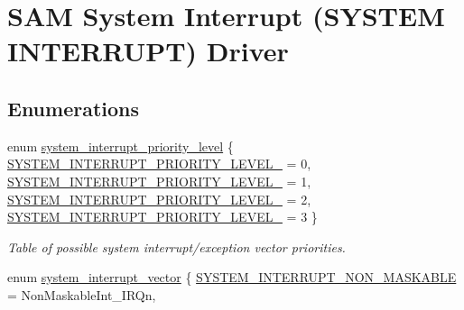 \hypertarget{group__asfdoc__sam0__system__interrupt__group}{}\section{S\+AM System Interrupt (S\+Y\+S\+T\+EM I\+N\+T\+E\+R\+R\+U\+PT) Driver}
\label{group__asfdoc__sam0__system__interrupt__group}
\subsection*{Enumerations}
\begin{DoxyCompactItemize}
\item 
enum \mbox{\hyperlink{group__asfdoc__sam0__system__interrupt__group_ga6d21907577ff204de7f5fa4642c84589}{system\+\_\+interrupt\+\_\+priority\+\_\+level}} \{ \mbox{\hyperlink{group__asfdoc__sam0__system__interrupt__group_gga6d21907577ff204de7f5fa4642c84589a0f1cdf1b338d57e8ca09e7007f72086f}{S\+Y\+S\+T\+E\+M\+\_\+\+I\+N\+T\+E\+R\+R\+U\+P\+T\+\_\+\+P\+R\+I\+O\+R\+I\+T\+Y\+\_\+\+L\+E\+V\+E\+L\+\_}} = 0, 
\mbox{\hyperlink{group__asfdoc__sam0__system__interrupt__group_gga6d21907577ff204de7f5fa4642c84589af0f65bd2a3ef76e3e3dabcfc00a012e4}{S\+Y\+S\+T\+E\+M\+\_\+\+I\+N\+T\+E\+R\+R\+U\+P\+T\+\_\+\+P\+R\+I\+O\+R\+I\+T\+Y\+\_\+\+L\+E\+V\+E\+L\+\_}} = 1, 
\mbox{\hyperlink{group__asfdoc__sam0__system__interrupt__group_gga6d21907577ff204de7f5fa4642c84589a1223c3ab580e129c952773a0726d33ea}{S\+Y\+S\+T\+E\+M\+\_\+\+I\+N\+T\+E\+R\+R\+U\+P\+T\+\_\+\+P\+R\+I\+O\+R\+I\+T\+Y\+\_\+\+L\+E\+V\+E\+L\+\_}} = 2, 
\mbox{\hyperlink{group__asfdoc__sam0__system__interrupt__group_gga6d21907577ff204de7f5fa4642c84589a97e6f898ad4d881e5c693ce14c242761}{S\+Y\+S\+T\+E\+M\+\_\+\+I\+N\+T\+E\+R\+R\+U\+P\+T\+\_\+\+P\+R\+I\+O\+R\+I\+T\+Y\+\_\+\+L\+E\+V\+E\+L\+\_}} = 3
 \}
\begin{DoxyCompactList}\small\item\em Table of possible system interrupt/exception vector priorities. \end{DoxyCompactList}\item 
enum \mbox{\hyperlink{group__asfdoc__sam0__system__interrupt__group_ga43378e6222cc05290c1a0c6a9ba125cf}{system\+\_\+interrupt\+\_\+vector}} \{ \newline
\mbox{\hyperlink{group__asfdoc__sam0__system__interrupt__group_gga43378e6222cc05290c1a0c6a9ba125cfa8967f7e5e661234c374fd8fe6a7c7b4a}{S\+Y\+S\+T\+E\+M\+\_\+\+I\+N\+T\+E\+R\+R\+U\+P\+T\+\_\+\+N\+O\+N\+\_\+\+M\+A\+S\+K\+A\+B\+LE}} = Non\+Maskable\+Int\+\_\+\+I\+R\+Qn, 

\end{DoxyCompactItemize}
